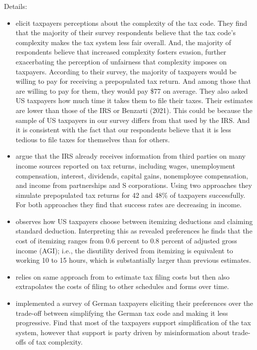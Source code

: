 \documentclass[12pt]{article}
\begin{document}
Details: 
\begin{itemize}
    \item \textcite{benzarti2024rising} elicit taxpayers perceptions about the complexity of the tax code. They find that the majority of their survey respondents believe that the tax code’s complexity makes the tax system less fair overall. And, the majority of respondents believe that increased complexity fosters evasion, further exacerbating the perception of unfairness that complexity imposes on taxpayers. According to their survey, the majority of taxpayers would be willing to pay for receiving a prepopulated tax return. And among those that are willing to pay for them, they would pay \$77 on average. They also asked US taxpayers how much time it takes them to file their taxes. Their estimates are lower than those of the IRS or Benzarti (2021). This could be because the sample of US taxpayers in our survey differs from that used by the IRS. And it is consistent with the fact that our respondents believe that it is less tedious to file taxes for themselves than for others.
    \item \textcite{goodman2023automated} argue that the IRS already receives information from third parties on many income sources reported on tax returns, including wages, unemployment compensation, interest, dividends, capital gains, nonemployee compensation, and income from partnerships and S corporations. Using two approaches they simulate prepopulated tax returns for 42 and 48\% of taxpayers successfully. For both approaches they find that success rates are decreasing in income. 
    \item \textcite{benzarti2020taxing} observes how US taxpayers choose between itemizing deductions and claiming standard deduction. Interpreting this as revealed preferences he finds that the cost of itemizing ranges from 0.6 percent to 0.8 percent of adjusted gross income (AGI); i.e., the disutility derived from itemizing is equivalent to working 10 to 15 hours, which is substantially larger than previous estimates.
    \item \textcite{benzarti2021estimating} relies on same approach from \textcite{benzarti2020taxing} to estimate tax filing costs but then also extrapolates the costs of filing to other schedules and forms over time. 
    \item \textcite{blesse2019people} implemented a survey of German taxpayers eliciting their preferences over the trade-off between simplifying the German tax code and making it less progressive. Find that most of the taxpayers support simplification of the tax system, however that support is party driven by misinformation about trade-offs of tax complexity. 

\end{itemize}
\end{document}
